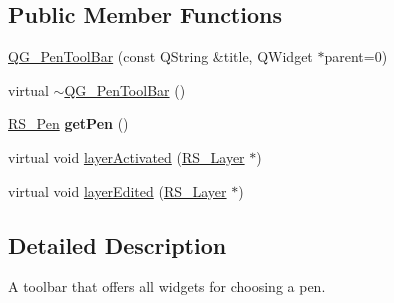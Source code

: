 \subsection*{Public Member Functions}
\begin{DoxyCompactItemize}
\item 
\hyperlink{classQG__PenToolBar_a5695405295a3e1d715f1d1caf3953d30}{Q\-G\-\_\-\-Pen\-Tool\-Bar} (const Q\-String \&title, Q\-Widget $\ast$parent=0)
\item 
virtual \hyperlink{classQG__PenToolBar_ac56a8e1998cad84325599a3d3e6fc0dd}{$\sim$\-Q\-G\-\_\-\-Pen\-Tool\-Bar} ()
\item 
\hypertarget{classQG__PenToolBar_a271d6ae5920beb2771b8d9154ddf3a4e}{\hyperlink{classRS__Pen}{R\-S\-\_\-\-Pen} {\bfseries get\-Pen} ()}\label{classQG__PenToolBar_a271d6ae5920beb2771b8d9154ddf3a4e}

\item 
virtual void \hyperlink{classQG__PenToolBar_abff89708b0d26081464a27c8f38b56c8}{layer\-Activated} (\hyperlink{classRS__Layer}{R\-S\-\_\-\-Layer} $\ast$)
\item 
virtual void \hyperlink{classQG__PenToolBar_a588144d019d5967f447ff1cdf0b38bec}{layer\-Edited} (\hyperlink{classRS__Layer}{R\-S\-\_\-\-Layer} $\ast$)
\end{DoxyCompactItemize}


\subsection{Detailed Description}
A toolbar that offers all widgets for choosing a pen. 

